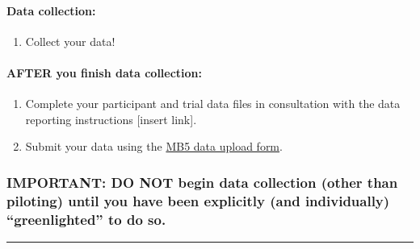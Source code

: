 \documentclass[
]{book}
\providecommand{\tightlist}{%
  \setlength{\itemsep}{0pt}\setlength{\parskip}{0pt}}
\theoremstyle{definition}
\theoremstyle{definition}
\theoremstyle{definition}
\theoremstyle{definition}
\theoremstyle{remark}
\begin{document}
\hypertarget{data-collection}{%
\paragraph*{Data collection:}\label{data-collection}}

\begin{enumerate}
\def\labelenumi{\arabic{enumi}.}
\setcounter{enumi}{9}
\tightlist
\item
  Collect your data!
\end{enumerate}

\hypertarget{after-you-finish-data-collection}{%
\paragraph*{AFTER you finish data collection:}\label{after-you-finish-data-collection}}

\begin{enumerate}
\def\labelenumi{\arabic{enumi}.}
\setcounter{enumi}{10}
\tightlist
\item
  Complete your participant and trial data files in consultation with the data reporting instructions {[}insert link{]}.
\item
  Submit your data using the \href{https://docs.google.com/forms/d/e/1FAIpQLSdFYk-gb4yjRYLjSTP1_BVaW-3vLkpJClLoY2BOGDGfIVE5ww/viewform?usp=sf_link}{MB5 data upload form}.
\end{enumerate}

\hypertarget{important-do-not-begin-data-collection-other-than-piloting-until-you-have-been-explicitly-and-individually-greenlighted-to-do-so.}{%
\subsubsection*{IMPORTANT: DO NOT begin data collection (other than piloting) until you have been explicitly (and individually) ``greenlighted'' to do so.}\label{important-do-not-begin-data-collection-other-than-piloting-until-you-have-been-explicitly-and-individually-greenlighted-to-do-so.}}

\begin{center}\rule{0.5\linewidth}{0.5pt}\end{center}
\end{document}
